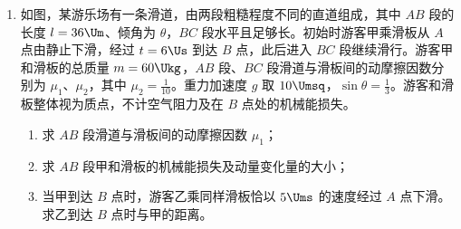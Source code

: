 \documentclass[\gkver]{gaokaozhenti}
\begin{document}
\begin{enumerate}
{代入数据解得 $\Delta V=1314\UmL$。
}

\item
如图，某游乐场有一条滑道，由两段粗糙程度不同的直道组成，其中 $AB$ 段的长度 $l=36\Um$、倾角为 $\theta$，$BC$ 段水平且足够长。初始时游客甲乘滑板从 $A$ 点由静止下滑，经过 $t=6\Us$ 到达 $B$ 点，此后进入 $BC$ 段继续滑行。游客甲和滑板的总质量 $m=60\Ukg$，$AB$ 段、$BC$ 段滑道与滑板间的动摩擦因数分别为 $\mu_{1}$、$\mu_{2}$，其中 $\mu_{2}=\frac{1}{10}$。重力加速度 $g$ 取 $10\Umsq$，$\sin\theta=\frac{1}{3}$。游客和滑板整体视为质点，不计空气阻力及在 $B$ 点处的机械能损失。
\begin{enumerate}
	\item
	求 $AB$ 段滑道与滑板间的动摩擦因数 $\mu_{1}$；
	\item
	求 $AB$ 段甲和滑板的机械能损失及动量变化量的大小；
	\item
	当甲到达 $B$ 点时，游客乙乘同样滑板恰以 $5\Ums$ 的速度经过 $A$ 点下滑。求乙到达 $B$ 点时与甲的距离。
\end{enumerate}
\onepicture[w=11.0cm, align=right]{}

\end{enumerate}
\end{document}
